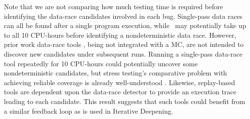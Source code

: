 Note that we are not comparing how much testing time is required before identifying the data-race candidates involved in each bug.
Single-pass data races can all be found after a single program execution,
while \quicksand~may potentially take up to all 10 CPU-hours before identifying a nondeterministic data race.
However, prior work data-race tools \cite{tsan}, being not integrated with a MC,
are not intended to discover new candidates under subsequent runs.
Running a single-pass data-race tool repeatedly for 10 CPU-hours could potentially uncover some nondeterministic candidates,
but stress testing's comparative problem with achieving reliable coverage is already well-understood
\cite{chess-icb,gambit}.
Likewise, replay-based tools \cite{portend} are dependent upon the data-race detector to provide an execution trace leading to each candidate.
This result suggests that
such tools could benefit from a similar feedback loop as is used in Iterative Deepening.


